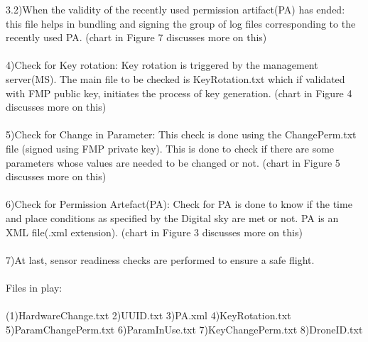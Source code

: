 \documentclass[18pt]{article}
\begin{document}
3.2)When the validity of the recently used permission artifact(PA) has ended: this file helps in bundling and signing the group of log files corresponding to the recently used PA.
(chart in Figure 7 discusses more on this)\\
\\
4)Check for Key rotation: Key rotation is triggered by the management server(MS). The main file to be checked is KeyRotation.txt which if validated with FMP public key, initiates the process of key generation. (chart in Figure 4 discusses more on this)\\
\\
5)Check for Change in  Parameter: This check is done using the ChangePerm.txt file (signed using FMP private key). This is done to check if there are some parameters whose values are needed to be changed or not. (chart in Figure 5 discusses more on this)\\
\\
6)Check for Permission Artefact(PA): Check for PA is done to know if the time and place conditions as specified by the Digital sky are met or not. PA is an XML file(.xml extension). (chart in Figure 3 discusses more on this)\\
\\
7)At last, sensor readiness checks are performed to ensure a safe flight.\\
\\
Files in play:\\
\\
(1)HardwareChange.txt  \hspace{1cm} 2)UUID.txt  \hspace{1cm}  3)PA.xml  \hspace{1cm}  4)KeyRotation.txt \hspace{1cm}   5)ParamChangePerm.txt  \hspace{1cm}   6)ParamInUse.txt  \hspace{1cm}  7)KeyChangePerm.txt\hspace{1cm}  8)DroneID.txt\\
\end{document}
